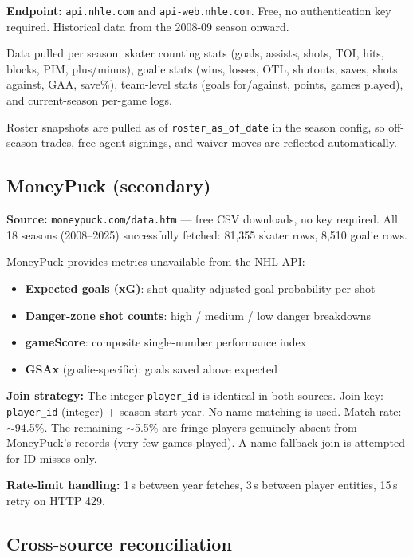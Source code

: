 \documentclass[11pt, a4paper]{article}
\begin{document}
\textbf{Endpoint:} \texttt{api.nhle.com} and \texttt{api-web.nhle.com}.
Free, no authentication key required. Historical data from the 2008-09 season onward.

Data pulled per season: skater counting stats (goals, assists, shots, TOI, hits, blocks, PIM,
plus/minus), goalie stats (wins, losses, OTL, shutouts, saves, shots against, GAA, save\%),
team-level stats (goals for/against, points, games played), and current-season per-game logs.

Roster snapshots are pulled as of \texttt{roster\_as\_of\_date} in the season config, so
off-season trades, free-agent signings, and waiver moves are reflected automatically.

\subsection{MoneyPuck (secondary)}

\textbf{Source:} \texttt{moneypuck.com/data.htm} — free CSV downloads, no key required.
All 18 seasons (2008--2025) successfully fetched: 81,355 skater rows, 8,510 goalie rows.

MoneyPuck provides metrics unavailable from the NHL API:
\begin{itemize}[leftmargin=*]
  \item \textbf{Expected goals (xG)}: shot-quality-adjusted goal probability per shot
  \item \textbf{Danger-zone shot counts}: high / medium / low danger breakdowns
  \item \textbf{gameScore}: composite single-number performance index
  \item \textbf{GSAx} (goalie-specific): goals saved above expected
\end{itemize}

\textbf{Join strategy:} The integer \texttt{player\_id} is identical in both sources.
Join key: \texttt{player\_id} (integer) $+$ season start year. No name-matching is used.
Match rate: $\sim$94.5\%. The remaining $\sim$5.5\% are fringe players genuinely absent from
MoneyPuck's records (very few games played). A name-fallback join is attempted for ID misses
only.

\textbf{Rate-limit handling:} 1\,s between year fetches, 3\,s between player entities, 15\,s
retry on HTTP 429.

\subsection{Cross-source reconciliation}
\end{document}
